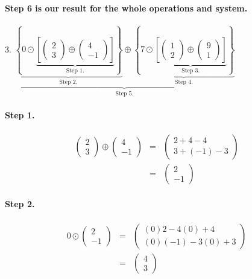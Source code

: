 \documentclass[11pt]{article}
\begin{document}
\paragraph{}\textbf{Step 6 is our result for the whole operations and system.}
\paragraph{}3.
$
\underbrace{
\underbrace{
\left\{
0 \odot
\underbrace{
\left[
\begin{pmatrix}
2\\
3
\end{pmatrix}
\oplus
\begin{pmatrix}
4\\
-1
\end{pmatrix}
\right]
}_\text{Step 1.}
\right\}
}_\text{Step 2.}
\oplus
\underbrace{
\left\{
7
\odot
\underbrace{
\left[
\begin{pmatrix}
1\\
2
\end{pmatrix}
\oplus
\begin{pmatrix}
9\\
1
\end{pmatrix}
\right]
}_\text{Step 3.}
\right\}
}_\text{Step 4.}
}_\text{Step 5.}
$
\paragraph{Step 1.}
\begin{eqnarray*}
\begin{pmatrix}
2\\
3
\end{pmatrix}
\oplus
\begin{pmatrix}
4\\
-1
\end{pmatrix}
&=&
\begin{pmatrix}
2+4-4\\
3+(-1)-3
\end{pmatrix}
\\&=&
\begin{pmatrix}
2\\
-1
\end{pmatrix}
\end{eqnarray*}
\paragraph{Step 2.}
\begin{eqnarray*}
0
\odot
\begin{pmatrix}
2\\
-1
\end{pmatrix}
&=&
\begin{pmatrix}
(0)2-4(0)+4\\
(0)(-1)-3(0)+3
\end{pmatrix}
\\&=&
\begin{pmatrix}
4\\
3
\end{pmatrix}
\end{eqnarray*}
\end{document}
